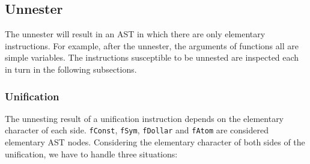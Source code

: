 \documentclass[a4paper]{memoir}
\begin{document}
\subsection{Unnester}\label{sec:arch:unnester}
The unnester will result in an AST in which there are only elementary instructions. For example, after the unnester, the arguments of functions all are simple variables. The instructions susceptible to be unnested are inspected each in turn in the following subsections.
\subsubsection{Unification}\label{sec:arch:unnester:unification}
The unnesting result of a unification instruction depends on the elementary
character of each side. \lstinline!fConst!, \lstinline!fSym!,
\lstinline!fDollar! and \lstinline!fAtom! are considered elementary AST nodes.
Considering the elementary character of both sides of the unification, we have to handle three situations:
\end{document}
